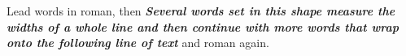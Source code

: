 \documentclass{article}
\begin{document}
Lead words in roman, then \textbf{\textsl{Several words set in this shape measure the widths of a whole line and then continue with more words that wrap onto the following line of text}} and roman again.
\end{document}
